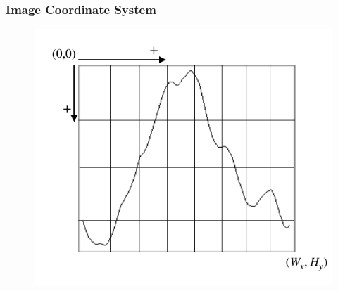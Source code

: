 \documentclass[aspectratio=169]{beamer}
\begin{document}

\begin{frame}
\frametitle{Image Coordinate System}
\begin{center}
\begin{figure}[h!]
\centering
\includegraphics[scale=0.9]{images/imagecoordinatesystemresume.pdf}
\label{fig:imagecoordinatesystem}
\end{figure}
\end{center}
\end{frame}
\end{document}
